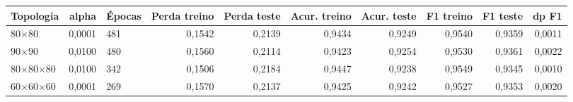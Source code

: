 \begin{tabular}{lrlrrrrrrr}
\toprule
Topologia & alpha & Épocas & Perda treino & Perda teste & Acur. treino & Acur. teste & F1 treino & F1 teste & dp F1 \\
\midrule
80×80 & 0,0001 & 481 & 0,1542 & 0,2139 & 0,9434 & 0,9249 & 0,9540 & 0,9359 & 0,0011 \\
90×90 & 0,0100 & 480 & 0,1560 & 0,2114 & 0,9423 & 0,9254 & 0,9530 & 0,9361 & 0,0022 \\
80×80×80 & 0,0100 & 342 & 0,1506 & 0,2184 & 0,9447 & 0,9238 & 0,9549 & 0,9345 & 0,0010 \\
60×60×60 & 0,0001 & 269 & 0,1570 & 0,2137 & 0,9425 & 0,9242 & 0,9527 & 0,9353 & 0,0020 \\
\bottomrule
\end{tabular}
